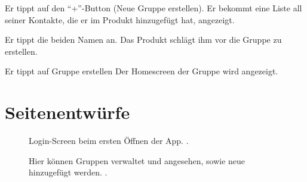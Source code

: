 \documentclass[parskip=full,11pt]{scrartcl}
\begin{document}
{Er tippt auf den \enquote{+}-Button (Neue Gruppe erstellen).}
{Er bekommt eine Liste all seiner Kontakte, die er im Produkt hinzugefügt hat, angezeigt.}

{Er tippt die beiden Namen an.}
{Das Produkt schlägt ihm vor die Gruppe zu erstellen.}

{Er tippt auf Gruppe erstellen}
{Der Homescreen der Gruppe wird angezeigt.} %

\pagebreak
\appendix

\section{Seitenentwürfe}


\begin{figure}[hb]
	\caption{\label{fig:menu}
		Login-Screen beim ersten Öffnen der App.
		 .
	}
\end{figure}

\begin{figure}[hb]
	\caption{\label{fig:groups}
		Hier können Gruppen verwaltet und angesehen, sowie neue hinzugefügt werden.
		.
	}
\end{figure}
\end{document}
